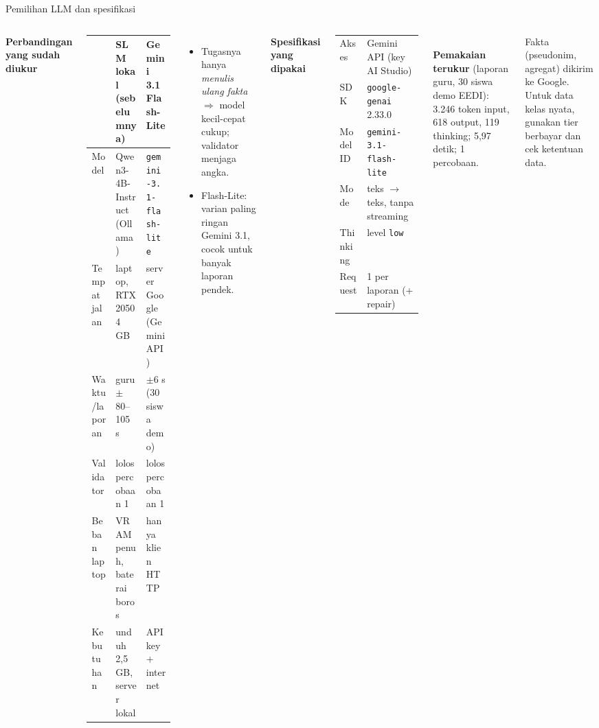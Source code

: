 \documentclass[aspectratio=169,10pt]{beamer}
\begin{document}
\begin{frame}{Pemilihan LLM dan spesifikasi}
  \begin{columns}[T]
    \footnotesize
    \textbf{Perbandingan yang sudah diukur}\\[3pt]
    \scriptsize
    \begin{tabularx}{\linewidth}{@{}l L L@{}}
      \toprule
      & SLM lokal (sebelumnya) & \textbf{Gemini 3.1 Flash-Lite} \\
      \midrule
      Model & Qwen3-4B-Instruct (Ollama) & \texttt{gemini-3.1-flash-lite} \\
      Tempat jalan & laptop, RTX 2050 4 GB & server Google (Gemini API) \\
      Waktu/laporan & guru $\pm$80--105 s & $\pm$6 s (30 siswa demo) \\
      Validator & lolos percobaan 1 & lolos percobaan 1 \\
      Beban laptop & VRAM penuh, baterai boros & hanya klien HTTP \\
      Kebutuhan & unduh 2,5 GB, server lokal & API key + internet \\
      \bottomrule
    \end{tabularx}
    \vspace{0.4em}
    \begin{itemize}
      \item Tugasnya hanya \emph{menulis ulang fakta} $\Rightarrow$ model kecil-cepat cukup; validator menjaga angka.
      \item Flash-Lite: varian paling ringan Gemini 3.1, cocok untuk banyak laporan pendek.
    \end{itemize}
    \footnotesize
    \textbf{Spesifikasi yang dipakai}\\[3pt]
    \begin{tabular}{@{}ll@{}}
      \toprule
      Akses & Gemini API (key AI Studio) \\
      SDK & \texttt{google-genai} 2.33.0 \\
      Model ID & \texttt{gemini-3.1-flash-lite} \\
      Mode & teks $\to$ teks, tanpa streaming \\
      Thinking & level \texttt{low} \\
      Request & 1 per laporan (+ repair) \\
      \bottomrule
    \end{tabular}\\[5pt]
    \textbf{Pemakaian terukur} (laporan guru, 30 siswa demo EEDI): 3.246 token input, 618 output, 119 thinking;
    5,97 detik; 1 percobaan.
    \begin{warnbox}
      Fakta (pseudonim, agregat) dikirim ke Google. Untuk data kelas nyata, gunakan tier berbayar dan cek ketentuan data.
    \end{warnbox}
  \end{columns}
\end{frame}
\end{document}
